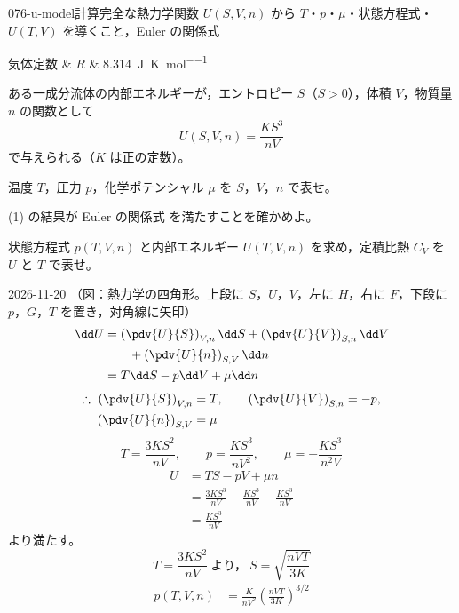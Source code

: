 \documentclass[uplatex,dvipdfmx,a4paper,11pt]{jsarticle}
\begin{document}
\mondaihen
{}
\begin{mondai}{076-u-model}{計算}{完全な熱力学関数 $U(S,V,n)$ から $T$・$p$・$\mu$・状態方程式・$U(T,V)$ を導くこと，Euler の関係式}
\begin{teisuu}
  気体定数 & $R$ & \qty{8.314}{\joule\per\kelvin\per\mole}\\
\end{teisuu}
ある一成分流体の内部エネルギーが，エントロピー $S$（$S > 0$），体積 $V$，物質量 $n$ の関数として
  \[ U(S,V,n) = \frac{KS^{3}}{nV} \]
  で与えられる（$K$ は正の定数）。
  \begin{shoumon}
    \item 温度 $T$，圧力 $p$，化学ポテンシャル $\mu$ を $S$，$V$，$n$ で表せ。
    \item (1) の結果が Euler の関係式  を満たすことを確かめよ。
    \item 状態方程式 $p(T,V,n)$ と内部エネルギー $U(T,V,n)$ を求め，定積比熱 $C_{V}$ を $U$ と $T$ で表せ。
  \end{shoumon}
\begin{kotaeutsushi}{2026-11-20}
（図：熱力学の四角形。上段に $S$，$U$，$V$，左に $H$，右に $F$，下段に $p$，$G$，$T$ を置き，対角線に矢印）
\begin{align*}
\dd U&=\left(\pdv{U}{S}\right)_{V,n}\dd S+\left(\pdv{U}{V}\right)_{S,n}\dd V\\
&\qquad+\left(\pdv{U}{n}\right)_{S,V}\dd n\\
&=T\dd S-p\dd V+\mu\dd n
\end{align*}
\begin{align*}
\therefore\ \left(\pdv{U}{S}\right)_{V,n}&=T, \qquad \left(\pdv{U}{V}\right)_{S,n}=-p,\\
\left(\pdv{U}{n}\right)_{S,V}&=\mu
\end{align*}
\[ T=\frac{3KS^{2}}{nV}, \qquad p=\frac{KS^{3}}{nV^{2}}, \qquad \mu=-\frac{KS^{3}}{n^{2}V} \]
\begin{align*}
U&=TS-pV+\mu n\\
&=\frac{3KS^{3}}{nV}-\frac{KS^{3}}{nV}-\frac{KS^{3}}{nV}\\
&=\frac{KS^{3}}{nV}
\end{align*}
より満たす。
\[ T=\frac{3KS^{2}}{nV}\ \text{より，}\ S=\sqrt{\frac{nVT}{3K}} \]
\begin{align*}
p(T,V,n)&=\frac{K}{nV^{2}}\left(\frac{nVT}{3K}\right)^{3/2}\\

\end{align*}
\end{kotaeutsushi}
\end{mondai}
\end{document}
